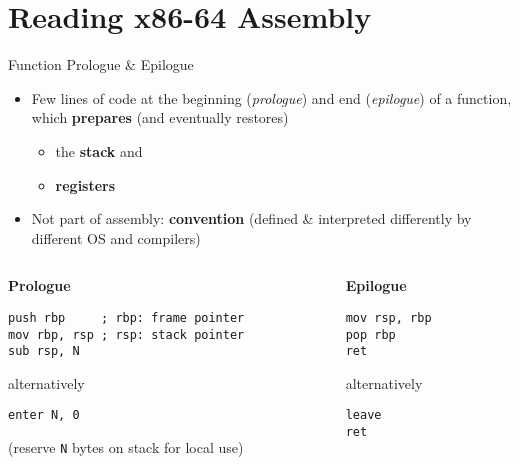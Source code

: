 \section{Reading x86-64 Assembly}

\begin{frame}
    \centering
    \scalebox{3}{Reading x86-64 Assembly}

    \scalebox{2}{\ldots for fun and profit}
\end{frame}

\begin{frame}[fragile]{Function Prologue \& Epilogue}
    \begin{itemize}
        \item Few lines of code at the beginning (\textit{prologue}) and end (\textit{epilogue}) of a function, which \textbf{prepares} (and eventually restores)
        \begin{itemize}
            \item the \textbf{stack} and 
            \item \textbf{registers}
        \end{itemize}
        \item Not part of assembly: \textbf{convention} (defined \& interpreted differently by different OS and compilers)
    \end{itemize}

    \begin{columns}[t]
        \begin{column}{.45\textwidth}
            \textbf{Prologue}
            \begin{lstlisting}[language={}]
push rbp     ; rbp: frame pointer
mov rbp, rsp ; rsp: stack pointer
sub rsp, N
            \end{lstlisting}
            alternatively
            \begin{lstlisting}[language={}]
enter N, 0
            \end{lstlisting}
            (reserve \texttt{N} bytes on stack for local use)
        \end{column}
        \begin{column}{.45\textwidth}
            \textbf{Epilogue}
            \begin{lstlisting}[language={}]
mov rsp, rbp
pop rbp
ret
            \end{lstlisting}
            alternatively
            \begin{lstlisting}[language={}]
leave
ret
            \end{lstlisting}
        \end{column}
    \end{columns}
\end{frame}

